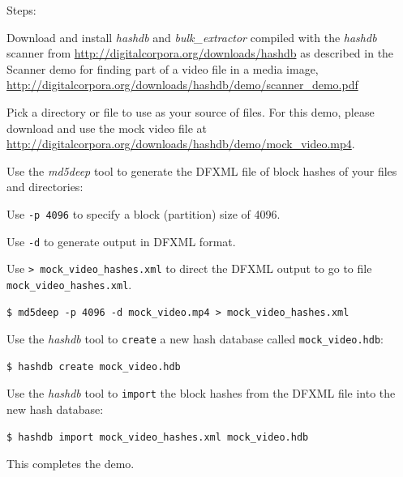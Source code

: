 \documentclass[12pt,twoside]{article}
\newcommand{\hdb}{\emph{hashdb}\xspace}
\newcommand{\bulk}{\emph{bulk\_extractor}\xspace}
\newcommand{\mdd}{\emph{md5deep}\xspace}
\begin{document}
Steps:
\begin{compactenum}
\item Download and install \hdb and \bulk compiled with the \hdb scanner
from
\url{http://digitalcorpora.org/downloads/hashdb}
as described in the Scanner demo
for finding part of a video file in a media image,
\url{http://digitalcorpora.org/downloads/hashdb/demo/scanner\_demo.pdf}
\item Pick a directory or file to use
as your source of files.
For this demo, please download and use the mock video file at
\url{http://digitalcorpora.org/downloads/hashdb/demo/mock\_video.mp4}.

\item Use the \mdd tool to generate the DFXML file of block hashes
of your files and directories:
\begin{compactitem}
\item Use \texttt{-p 4096} to specify a block (partition) size of 4096.
\item Use \texttt{-d} to generate output in DFXML format.
\item Use \texttt{> mock\_video\_hashes.xml} to direct the DFXML output
to go to file \\
\texttt{mock\_video\_hashes.xml}.
\end{compactitem}
\begin{verbatim}
$ md5deep -p 4096 -d mock_video.mp4 > mock_video_hashes.xml
\end{verbatim}

\item Use the \hdb tool to \texttt{create} a new hash database
called \texttt{mock\_video.hdb}:
\begin{verbatim}
$ hashdb create mock_video.hdb
\end{verbatim}

\item Use the \hdb tool to \texttt{import} the block hashes
from the DFXML file into the new hash database:
\begin{verbatim}
$ hashdb import mock_video_hashes.xml mock_video.hdb
\end{verbatim}
\end{compactenum}

This completes the demo.
\end{document}
